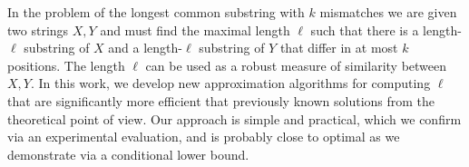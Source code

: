 
\newcommand{\inputLCS}[1]{}
\newcommand{\figLCS}[2]{\texttt{[image: Part\_Two/lcs/\#2]}}

\newcommand{\lcpe}{\mathrm{LCP}_{(1+\eps)k}}
\newcommand{\lcp}{\mathrm{LCP}_{\tilde{k}}}
\newcommand{\lcpk}{\mathrm{LCP}_{k}}
\newcommand{\lcsk}{\mathrm{LCS}_{k}}
\newcommand{\lcske}{\mathrm{LCS}_{(1+\eps)k}}
\newcommand{\lcsak}{\mathrm{LCS}_{\tilde{k}}}
\newcommand{\sk}{\mathrm{sk}}
\newcommand{\Prob}{\mathrm{Pr}}
\newcommand{\LCSp}{\textsf{LCS}\xspace}
\newcommand{\kLCS}{\textsf{LCS with $k$ Mismatches}\xspace}
\newcommand{\kApproxLCS}{\textsf{LCS with Approximately $k$ Mismatches}\xspace}
\newcommand{\Bichromatic}{\textsf{$(1+\gamma)$-approximate Bichromatic Closest Pair}\xspace}
\newcommand{\NN}{\textsf{Approximate Near Neighbour}\xspace}
\newcommand{\twentyquestions}{\textsf{Twenty Questions}\xspace}
\newcommand{\Carole}{\mathit{Carole}}
\newcommand{\pop}{\mathit{pop}}
\newcommand{\push}{\mathit{push}}
\newcommand{\ttop}{\mathit{top}}
\newcommand{\mmid}{\mathit{mid}}

\newcommand{\Hashes}{\mathcal{H}}
\newcommand{\Collisions}{C}
\newcommand{\Bad}{B}
\newcommand{\Projections}{\Pi}
\newcommand{\Pos}{\mathsf{P}}
\newcommand{\HD}{d_H}

\providecommand{\LCP}{\mathrm{LCP}}
\providecommand{\ceil}[1]{\ensuremath{\lceil#1\rceil}}
\providecommand{\eps}{\varepsilon}

\newcommand{\norm}[1]{\ensuremath{\lVert#1\rVert}}

\newcommand\restr[2]{{
  \left.\kern-\nulldelimiterspace
  #1 
  \vphantom{\big|}
  \right|_{#2} 
}}

\begin{small}
    In the problem of the longest common substring with $k$ mismatches we are given two strings $X, Y$ and must find the maximal length $\ell$ such that there is a length-$\ell$ substring of $X$ and a length-$\ell$ substring of $Y$ that differ in at most $k$ positions. The length $\ell$ can be used as a robust measure of similarity between $X, Y$. In this work, we develop new approximation algorithms for computing $\ell$ that are significantly more efficient that previously known solutions from the theoretical point of view. Our approach is simple and practical, which we confirm via an experimental evaluation, and is probably close to optimal as we demonstrate via a conditional lower bound.
\end{small}


